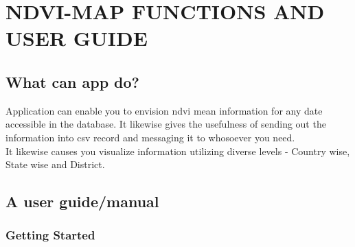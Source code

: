 \chapter{NDVI-MAP FUNCTIONS AND USER GUIDE}
\label{chap:tibet}

\section{What can app do?}

Application can enable you to envision \gls{ndvi} mean information for any date accessible in the database. It likewise gives the usefulness of sending out the information into \gls{csv} record and messaging it to whosoever you need. \\
It likewise causes you visualize information utilizing diverse levels - Country wise, State wise and District.

\section{A user guide/manual}

\subsection{Getting Started}

